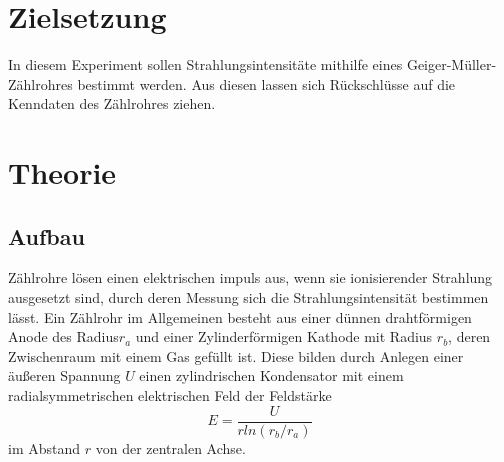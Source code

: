 \section{Zielsetzung}
In diesem Experiment sollen Strahlungsintensitäte mithilfe eines Geiger-Müller-Zählrohres bestimmt werden. Aus diesen lassen sich Rückschlüsse auf die Kenndaten des Zählrohres ziehen.
\section{Theorie}
\subsection{Aufbau}
Zählrohre lösen einen elektrischen impuls aus, wenn sie ionisierender Strahlung ausgesetzt sind, durch deren Messung sich die Strahlungsintensität bestimmen lässt.
Ein Zählrohr im Allgemeinen besteht aus einer dünnen drahtförmigen Anode des Radius$r_a$ und einer Zylinderförmigen Kathode mit Radius $r_b$, deren Zwischenraum mit einem Gas gefüllt ist. Diese bilden durch Anlegen einer äußeren Spannung $U$ einen zylindrischen Kondensator mit einem radialsymmetrischen elektrischen Feld der Feldstärke
\begin{equation}
E=\frac{U}{rln(r_b/r_a)}
\end{equation}
im Abstand $r$ von der zentralen Achse.
